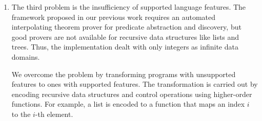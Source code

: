 \begin{enumerate}
%


%
%

\item The third problem is the insufficiency of supported language
      features.  The framework proposed in our previous work requires an
      automated interpolating theorem prover for predicate abstraction and
      discovery, but good provers are not available for recursive data
      structures like lists and trees. Thus, the implementation dealt with
      only integers as infinite data domains.

      We overcome the problem by transforming programs with unsupported
      features to ones with supported features.  The transformation is carried
      out by encoding recursive data structures and control operations using
      higher-order functions.  For example, a list is encoded to a function
      that maps an index $i$ to the $i$-th element.
\end{enumerate}


